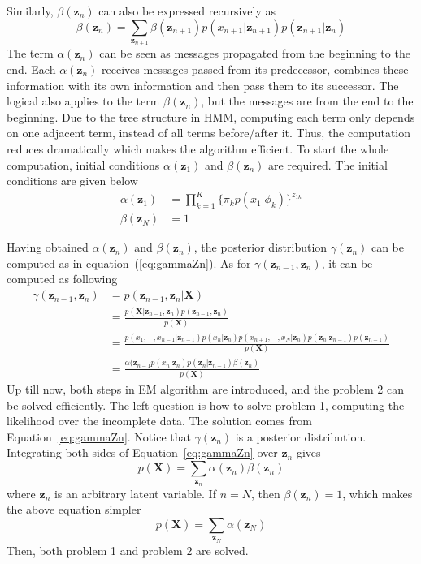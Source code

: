 Similarly, \(\beta(\mathbf{z}_n)\) can also be expressed recursively as
\begin{equation}
	\beta(\mathbf{z}_n) = \sum_{\mathbf{z}_{n+1}}\beta(\mathbf{z}_{n+1})p(x_{n+1}|\mathbf{z}_{n+1})p(\mathbf{z}_{n+1}|\mathbf{z}_n)
\end{equation}
The term \(\alpha(\mathbf{z}_n)\) can be seen as messages propagated from the beginning to the end. Each \(\alpha(\mathbf{z}_n)\) receives messages passed from its predecessor, combines these information with its own information and then pass them to its successor. The logical also applies to the term \(\beta(\mathbf{z}_n)\), but the messages are from the end to the beginning. Due to the tree structure in HMM, computing each term only depends on one adjacent term, instead of all terms before/after it. Thus, the computation reduces dramatically which makes the algorithm efficient. To start the whole computation, initial conditions \(\alpha(\mathbf{z}_1)\) and \(\beta(\mathbf{z}_n)\) are required. The initial conditions are given below
\begin{align}
	\alpha(\mathbf{z}_1) &= \prod_{k=1}^{K}\{\pi_k p(x_1 | \phi_k) \}^{z_{1k}}	\\
	\beta(\mathbf{z}_N) &= 1
\end{align}

Having obtained \(\alpha(\mathbf{z}_n)\) and \(\beta(\mathbf{z}_n)\), the posterior distribution \(\gamma(\mathbf{z}_n)\) can be computed as in equation~(\ref{eq:gammaZn}). As for \(\gamma(\mathbf{z}_{n-1}, \mathbf{z}_n)\), it can be computed as following
\begin{align}
\gamma(\mathbf{z}_{n-1}, \mathbf{z}_n) &= p(\mathbf{z}_{n-1}, \mathbf{z}_n | \mathbf{X}) \nonumber \\
									   & = \frac{p(\mathbf{X} | \mathbf{z}_{n-1}, \mathbf{z}_n)p(\mathbf{z}_{n-1}, \mathbf{z}_n)}{p(\mathbf{X})}\nonumber \\
									   & = \frac{p(x_1, \cdots, x_{n-1} | \mathbf{z}_{n-1}) p(x_n | \mathbf{z}_n) p(x_{n+1}, \cdots, x_N | \mathbf{z}_n)
									   			 p(\mathbf{z}_n | \mathbf{z}_{n-1}) p(\mathbf{z}_{n-1})}{p(\mathbf{X})}\nonumber \\
									   & = \frac{\alpha(\mathbf{z}_{n-1}p(x_n|\mathbf{z}_n)p(\mathbf{z}_n|\mathbf{z}_{n-1})\beta(\mathbf{z}_n)}{p(\mathbf{X})}
\end{align}
Up till now, both steps in EM algorithm are introduced, and the problem 2 can be solved efficiently. The left question is how to solve problem 1, computing the likelihood over the incomplete data. The solution comes from  Equation~\ref{eq:gammaZn}. Notice that \(\gamma(\mathbf{z}_n)\) is a posterior distribution. Integrating both sides of Equation~\ref{eq:gammaZn} over \(\mathbf{z}_n\) gives
\begin{equation}
	p(\mathbf{X}) = \sum_{\mathbf{z}_n} \alpha(\mathbf{z}_n)\beta(\mathbf{z}_n)
\end{equation}
where \(\mathbf{z}_n\) is an arbitrary latent variable. If \(n = N\), then \(\beta(\mathbf{z}_n) = 1\), which makes the above equation simpler
\begin{equation}
	p(\mathbf{X}) = \sum_{\mathbf{z}_N} \alpha(\mathbf{z}_N)
\end{equation}
Then, both problem 1 and problem 2 are solved.